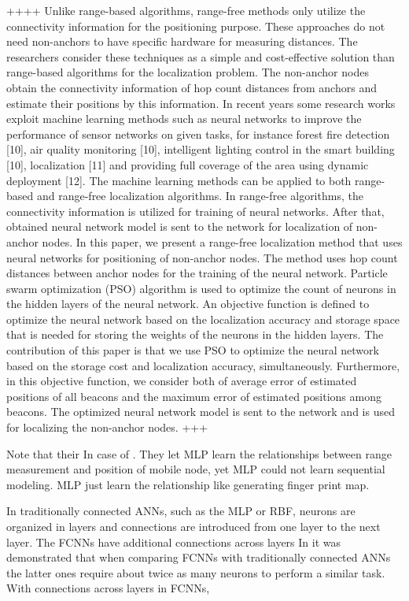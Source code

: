 \documentclass{ieeeaccess}
\begin{document}
++++
Unlike range-based algorithms, range-free methods only utilize the connectivity
information for the positioning purpose. These approaches do not need non-anchors to
have specific hardware for measuring distances. The researchers consider these techniques
as a simple and cost-effective solution than range-based algorithms for the localization
problem. The non-anchor nodes obtain the connectivity information of hop count distances
from anchors and estimate their positions by this information. In recent years some
research works exploit machine learning methods such as neural networks to improve the
performance of sensor networks on given tasks, for instance forest fire detection [10], air
quality monitoring [10], intelligent lighting control in the smart building [10], localization
[11] and providing full coverage of the area using dynamic deployment [12]. The machine
learning methods can be applied to both range-based and range-free localization algorithms. In range-free algorithms, the connectivity information is utilized for training of
neural networks. After that, obtained neural network model is sent to the network for
localization of non-anchor nodes. In this paper, we present a range-free localization method that uses neural networks for
positioning of non-anchor nodes. The method uses hop count distances between anchor
nodes for the training of the neural network. Particle swarm optimization (PSO) algorithm
is used to optimize the count of neurons in the hidden layers of the neural network. An
objective function is defined to optimize the neural network based on the localization
accuracy and storage space that is needed for storing the weights of the neurons in the
hidden layers. The contribution of this paper is that we use PSO to optimize the neural
network based on the storage cost and localization accuracy, simultaneously. Furthermore,
in this objective function, we consider both of average error of estimated positions of all
beacons and the maximum error of estimated positions among beacons. The optimized
neural network model is sent to the network and is used for localizing the non-anchor
nodes.
+++

Note that their In case of \cite{shareef2008localization}. They let MLP learn the relationships between range measurement and position of mobile node, yet MLP could not learn sequential modeling. MLP just learn the relationship like generating finger print map. 

In traditionally connected ANNs, such as the MLP or
RBF, neurons are organized in layers and connections are
introduced from one layer to the next layer. The FCNNs
have additional connections across layers
In \cite{jain2010data} it was
demonstrated that when comparing FCNNs with traditionally connected ANNs the latter ones require about twice as
many neurons to perform a similar task. With connections
across layers in FCNNs,
\end{document}
